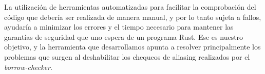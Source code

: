 La utilización de herramientas automatizadas para facilitar la comprobación del código que debería ser realizada de manera manual, y por lo tanto sujeta a fallos, ayudaría a minimizar los errores y el tiempo necesario para mantener las garantías de seguridad que uno espera de un programa Rust. Ese es nuestro objetivo, y la herramienta que desarrollamos apunta a resolver principalmente los problemas que surgen al deshabilitar los chequeos de aliasing realizados por el \textit{borrow-checker}.
